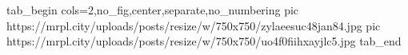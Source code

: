  
 
 
 
 


\ifcmt
  tab_begin cols=2,no_fig,center,separate,no_numbering
     pic https://mrpl.city/uploads/posts/resize/w/750x750/zylaeesuc48jan84.jpg
		 pic https://mrpl.city/uploads/posts/resize/w/750x750/uo4f0fiihxayjlc5.jpg
  tab_end
\fi

